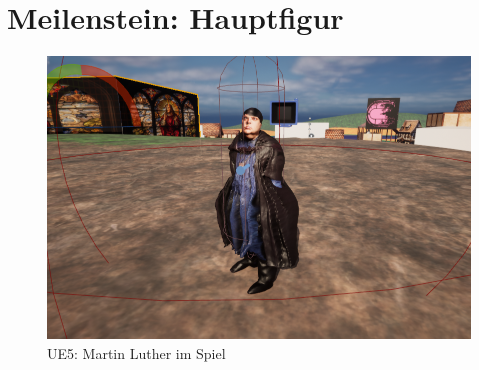 \section {Meilenstein: Hauptfigur}
\begin{figure}
	 \centering
	\includegraphics[width=14cm]{BilderFuerBA/MartinLutherImSpiel.png}
	\caption{UE5: Martin Luther im Spiel}
	\label{MartinLutherImSpiel}
\end{figure}

